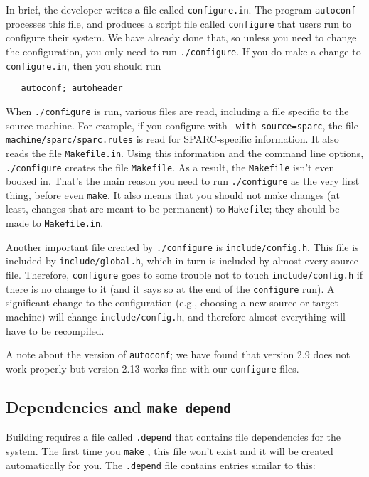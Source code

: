 {In brief, the developer writes a file called \texttt{configure.in}. The program
\texttt{autoconf} processes this file, and produces a script file called
\texttt{configure} that users run to configure their system. We have
already done that, so unless you need to change the configuration, you
only need to run \texttt{./configure}. If you do make a change to
\verb!configure.in!, then you should run
\begin{verbatim}
   autoconf; autoheader
\end{verbatim}

When \texttt{./configure} is run, various files are read, including a file
specific to the source machine. For example, if you configure with
\texttt{--with-source=sparc}, the file \texttt{machine/sparc/sparc.rules}
is read for SPARC-specific information. It also reads the file
\texttt{Makefile.in}. Using this information and the command line options,
\texttt{./configure} creates the file \texttt{Makefile}.
As a result, the \texttt{Makefile} isn't even
booked in. That's the main reason you need to run \texttt{./configure} as
the very first thing, before even \texttt{make}. It also means that you
should not make changes (at least, changes that are meant to be permanent)
to \verb!Makefile!; they should be made to \texttt{Makefile.in}.

Another important file created by \verb!./configure! is \verb!include/config.h!.
This file is included by \verb!include/global.h!, which in turn is included
by almost every source file. Therefore, \verb!configure! goes to some trouble
not to touch \verb!include/config.h! if there is no change to it (and it says
so at the end of the \verb!configure! run). A significant change to the
configuration (e.g., choosing a new source or target machine) will
change \verb!include/config.h!, and therefore almost everything will
have to be recompiled.

A note about the version of \texttt{autoconf}; we have found that 
version 2.9 does not work properly but version 2.13 works fine with 
our \texttt{configure} files. 


\subsection{Dependencies and \texttt{make depend}}
Building \walk requires a file called \verb!.depend!
that contains file dependencies for the system.
The first time you \verb!make! \walk,
this file won't exist
and it will be created automatically for you.
The \verb!.depend! file contains entries similar to this:

}
